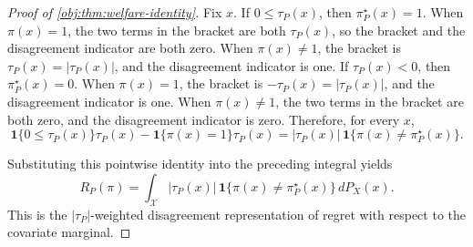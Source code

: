 \documentclass[11pt]{article}
\begin{document}
\begin{proof}[Proof of \cref{obj:thm:welfare-identity}]
Fix \(x\).  If \(0\le\tau_P(x)\), then \(\pi^\star_P(x)=1\).  When \(\pi(x)=1\), the two terms in the bracket are both \(\tau_P(x)\), so the bracket and the disagreement indicator are both zero.  When \(\pi(x)\ne1\), the bracket is \(\tau_P(x)=|\tau_P(x)|\), and the disagreement indicator is one.  If \(\tau_P(x)<0\), then \(\pi^\star_P(x)=0\).  When \(\pi(x)=1\), the bracket is \(-\tau_P(x)=|\tau_P(x)|\), and the disagreement indicator is one.  When \(\pi(x)\ne1\), the two terms in the bracket are both zero, and the disagreement indicator is zero.  Therefore, for every \(x\),
\[
\mathbf 1\{0\le\tau_P(x)\}\tau_P(x)
-
\mathbf 1\{\pi(x)=1\}\tau_P(x)
=
|\tau_P(x)|\,\mathbf 1\{\pi(x)\ne\pi^\star_P(x)\}.
\]

Substituting this pointwise identity into the preceding integral yields
\[
R_P(\pi)
=
\int_{\mathcal X}
|\tau_P(x)|\,\mathbf 1\{\pi(x)\ne\pi^\star_P(x)\}\,dP_X(x).
\]
This is the \(|\tau_P|\)-weighted disagreement representation of regret with respect to the covariate marginal.
\end{proof}
\end{document}
